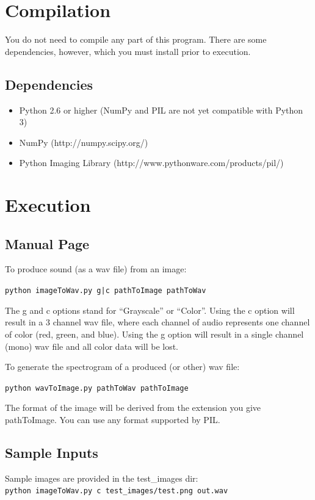 \documentclass[12pt,letterpaper]{article}
\begin{document}

\section{Compilation}

You do not need to compile any part of this program. There are some dependencies, however, which you must install prior to execution.

\subsection{Dependencies}

\begin{itemize}
\item Python 2.6 or higher (NumPy and PIL are not yet compatible with Python 3)
\item NumPy (http://numpy.scipy.org/)
\item Python Imaging Library (http://www.pythonware.com/products/pil/)
\end{itemize}

\section{Execution}
\subsection{Manual Page}
\noindent
To produce sound (as a wav file) from an image:

\verb!python imageToWav.py g|c pathToImage pathToWav!

\noindent
The g and c options stand for ``Grayscale'' or ``Color''. Using the c option will result in a 3 channel wav file, where each channel of audio represents one channel of color (red, green, and blue). Using the g option will result in a single channel (mono) wav file and all color data will be lost.

\noindent
To generate the spectrogram of a produced (or other) wav file:

\verb!python wavToImage.py pathToWav pathToImage!

\noindent
The format of the image will be derived from the extension you give pathToImage. You can use any format supported by PIL.

\subsection{Sample Inputs}
\noindent
Sample images are provided in the test\_images dir: \\
\verb!python imageToWav.py c test_images/test.png out.wav!
\end{document}
